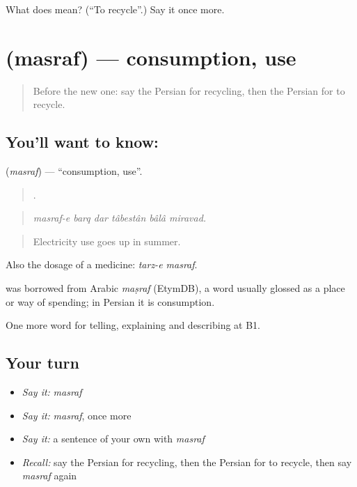 \begin{tcolorbox}[breakable,colback=teal!4,colframe=teal!35!black,title={Before you move on}]
What does   mean? (\textquotedblleft{}To recycle\textquotedblright{}.) Say it once more.
\end{tcolorbox}
\section[\texorpdfstring{\fa{مصرف} (masraf)}{مصرف (masraf)}]{ (masraf) — consumption, use}

\label{lesson:FA-C388-masraf}



\begin{quote}
Before the new one: say the Persian for recycling, then the Persian for to recycle.
\end{quote}

\subsection*{You'll want to know: }
\textbf{} (\emph{masraf}) — \textquotedblleft{}consumption, use\textquotedblright{}.

\begin{quote}
     .
\end{quote}

\begin{quote}
\emph{masraf-e barq dar tâbestân bâlâ miravad.}
\end{quote}

\begin{quote}
Electricity use goes up in summer.
\end{quote}

Also the dosage of a medicine: \emph{tarz-e masraf}.

\begin{cousinweb}
\textbf{} was borrowed from Arabic \emph{maṣraf} (EtymDB), a word usually glossed as a place or way of spending; in Persian it is consumption.
\end{cousinweb}

\begin{grammarlens}[title={What you've built}]
One more word for telling, explaining and describing at B1.
\end{grammarlens}

\subsection*{Your turn}
\begin{itemize}
\raggedright
  \item \emph{Say it:} \emph{masraf}
  \item \emph{Say it:} \emph{masraf}, once more
  \item \emph{Say it:} a sentence of your own with \emph{masraf}
  \item \emph{Recall:} say the Persian for recycling, then the Persian for to recycle, then say \emph{masraf} again
\end{itemize}

